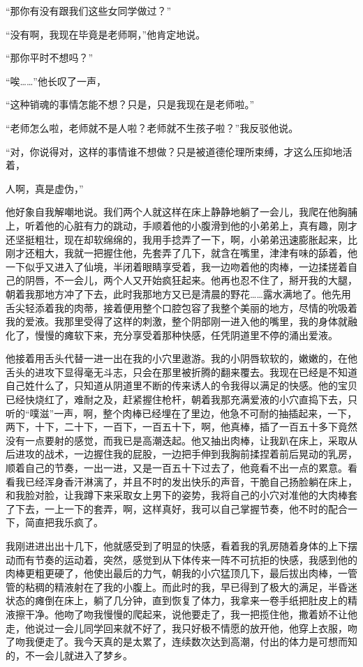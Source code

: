 \documentclass[12pt,UTF8]{ctexbook}
\begin{document}
“那你有没有跟我们这些女同学做过？”

“没有啊，我现在毕竟是老师啊，”他肯定地说。

“那你平时不想吗？”

“唉……”他长叹了一声，

“这种销魂的事情怎能不想？只是，只是我现在是老师啦。”

“老师怎么啦，老师就不是人啦？老师就不生孩子啦？”我反驳他说。

“对，你说得对，这样的事情谁不想做？只是被道德伦理所束缚，才这么压抑地活着，

人啊，真是虚伪，”

他好象自我解嘲地说。我们两个人就这样在床上静静地躺了一会儿，我爬在他胸脯上，听着他的心脏有力的跳动，手顺着他的小腹滑到他的小弟弟上，真有趣，刚才还坚挺粗壮，现在却软绵绵的，我用手捻弄了一下，啊，小弟弟迅速膨胀起来，比刚才还粗大，我就一把握住他，先套弄了几下，就含在嘴里，津津有味的舔着，他一下似乎又进入了仙境，半闭着眼睛享受着，我一边吻着他的肉棒，一边揉搓着自己的阴唇，不一会儿，两个人又开始疯狂起来。他再也忍不住了，掰开我的大腿，朝着我那地方冲了下去，此时我那地方又已是清晨的野花……露水满地了。他先用舌尖轻添着我的肉蒂，接着便用整个口腔包容了我整个美丽的地方，尽情的吮吸着我的爱液。我那里受得了这样的刺激，整个阴部刚一进入他的嘴里，我的身体就融化了，慢慢的瘫软下来，充分享受着那种快感，任凭阴道里不停的涌出爱液。

他接着用舌头代替一进一出在我的小穴里遨游。我的小阴唇软软的，嫩嫩的，在他舌头的进攻下显得毫无斗志，只会在那里被折腾的翻来覆去。我现在已经是不知道自己姓什么了，只知道从阴道里不断的传来诱人的令我得以满足的快感。他的宝贝已经快烧红了，难耐之及，赶紧握住枪杆，朝着我那充满爱液的小穴直捣下去，只听的“噗滋”一声，啊，整个肉棒已经埋在了里边，他急不可耐的抽插起来，一下，两下，十下，二十下，一百下，一百五十下，啊，他真棒，插了一百五十多下竟然没有一点要射的感觉，而我已是高潮迭起。他又抽出肉棒，让我趴在床上，采取从后进攻的战术，一边握住我的屁股，一边把手伸到我胸前揉捏着前后晃动的乳房，顺着自己的节奏，一出一进，又是一百五十下过去了，他竟看不出一点的累意。看看我已经浑身香汗淋漓了，并且不时的发出快乐的声音，干脆自己扬脸躺在床上，和我脸对脸，让我蹲下来采取女上男下的姿势，我将自己的小穴对准他的大肉棒套了下去，一上一下的套弄，啊，这样真好，我可以自己掌握节奏，他不时的配合一下，简直把我乐疯了。

我刚进进出出十几下，他就感受到了明显的快感，看着我的乳房随着身体的上下摆动而有节奏的运动着，突然，感觉到从下体传来一阵不可抗拒的快感，我感到他的肉棒更粗更硬了，他使出最后的力气，朝我的小穴猛顶几下，最后拔出肉棒，一管管的粘稠的精液射在了我的小腹上。而此时的我，早已得到了极大的满足，半昏迷状态的瘫倒在床上，躺了几分钟，直到恢复了体力，我拿来一卷手纸把肚皮上的精液擦干净。他吻了吻我慢慢的爬起来，说他要走了，我一把揽住他，撒着娇不让他走，他说过一会儿同学回来就不好了，我只好极不情愿的放开他，他穿上衣服，吻了吻我便走了。我今天真的是太累了，连续数次达到高潮，付出的体力是可想而知的，不一会儿就进入了梦乡。
\end{document}
